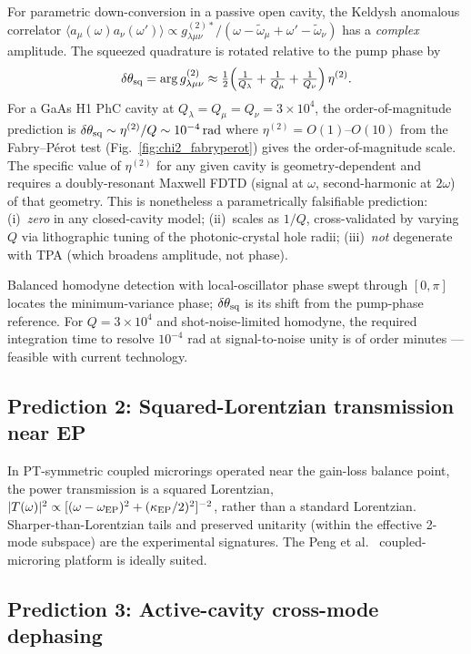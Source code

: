 \documentclass[11pt]{article}
\newcommand{\EP}{{\rm EP}}
\newcommand{\tomega}{\tilde{\omega}}
\begin{document}
For parametric down-conversion in a passive open cavity, the Keldysh
anomalous correlator
$\langle a_\mu(\omega)a_\nu(\omega')\rangle\propto g^{(2)*}_{\lambda\mu\nu}
/(\omega-\tomega_\mu+\omega'-\tomega_\nu)$ has a \emph{complex}
amplitude.  The squeezed quadrature is rotated relative to the pump
phase by
\begin{equation}
  \delta\theta_{\rm sq} = \arg g^{(2)}_{\lambda\mu\nu}
  \approx \tfrac{1}{2}\!\left(\tfrac{1}{Q_\lambda}+\tfrac{1}{Q_\mu}
  +\tfrac{1}{Q_\nu}\right)\eta^{(2)}.
\end{equation}
For a GaAs H1 PhC cavity at $Q_\lambda=Q_\mu=Q_\nu=3\times 10^4$,
the order-of-magnitude prediction is
$\delta\theta_{\rm sq}\sim\eta^{(2)}/Q\sim 10^{-4}\,\mathrm{rad}$
where $\eta^{(2)}=O(1)$--$O(10)$ from the Fabry--P\'erot test
(Fig.~\ref{fig:chi2_fabryperot}) gives the order-of-magnitude scale.
The specific value of $\eta^{(2)}$ for any given cavity is
geometry-dependent and requires a doubly-resonant Maxwell FDTD (signal
at $\omega$, second-harmonic at $2\omega$) of that geometry.  This is
nonetheless a parametrically falsifiable prediction:
(i)~\emph{zero} in any closed-cavity model;
(ii)~scales as $1/Q$, cross-validated by varying $Q$ via lithographic
tuning of the photonic-crystal hole radii;
(iii)~\emph{not} degenerate with TPA (which broadens amplitude, not
phase).

Balanced homodyne detection with local-oscillator phase swept through
$[0,\pi]$ locates the minimum-variance phase; $\delta\theta_{\rm sq}$
is its shift from the pump-phase reference.  For $Q=3\times 10^4$ and
shot-noise-limited homodyne, the required integration time to resolve
$10^{-4}$ rad at signal-to-noise unity is of order minutes --- feasible
with current technology.

\subsection*{Prediction 2: Squared-Lorentzian transmission near EP}

In PT-symmetric coupled microrings operated near the gain-loss
balance point, the power transmission is a squared Lorentzian,
$|T(\omega)|^2\propto[(\omega-\omega_\EP)^2+(\kappa_\EP/2)^2]^{-2}$,
rather than a standard Lorentzian.
Sharper-than-Lorentzian tails and preserved unitarity (within the
effective 2-mode subspace) are the experimental signatures.
The Peng et al.\ \cite{Peng2014} coupled-microring platform is
ideally suited.

\subsection*{Prediction 3: Active-cavity cross-mode dephasing}
\end{document}
